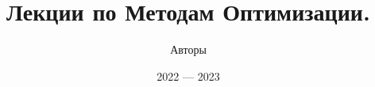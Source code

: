 \documentclass{article}
\begin{document}
\title{Лекции по Методам Оптимизации.}
\author{Авторы}
\date{2022 --- 2023}
\maketitle
\thispagestyle{empty}

\newpage
\thispagestyle{empty}
\tableofcontents


\Large %
\setlength{\baselineskip}{20pt} %










\end{document}

